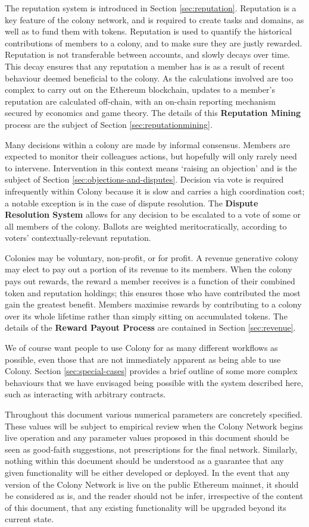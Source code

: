 The reputation system is introduced in Section \ref{sec:reputation}. Reputation is a key feature of the colony network, and is required to create tasks and domains, as well as to fund them with tokens. Reputation is used to quantify the historical contributions of members to a colony, and to make sure they are justly rewarded. Reputation is not transferable between accounts, and slowly decays over time. This decay ensures that any reputation a member has is as a result of recent behaviour deemed beneficial to the colony. As the calculations involved are too complex to carry out on the Ethereum blockchain, updates to a member's reputation are calculated off-chain, with an on-chain reporting mechanism secured by economics and game theory. The details of this \textbf{Reputation Mining} process are the subject of Section \ref{sec:reputationmining}.

Many decisions within a colony are made by informal consensus. Members are expected to monitor their colleagues actions, but hopefully will only rarely need to intervene. Intervention in this context means `raising an objection' and is the subject of Section \ref{sec:objections-and-disputes}. Decision via vote is required infrequently within Colony because it is slow and carries a high coordination cost; a notable exception is in the case of dispute resolution. The \textbf{Dispute Resolution System} allows for any decision to be escalated to a vote of some or all members of the colony. Ballots are weighted meritocratically, according to voters' contextually-relevant reputation.

Colonies may be voluntary, non-profit, or for profit. A revenue generative colony may elect to pay out a portion of its revenue to its members. When the colony pays out rewards, the reward a member receives is a function of their combined token and reputation holdings; this ensures those who have contributed the most gain the greatest benefit. Members maximise rewards by contributing to a colony over its whole lifetime rather than simply sitting on accumulated tokens. The details of the \textbf{Reward Payout Process} are contained in Section \ref{sec:revenue}.

We of course want people to use Colony for as many different workflows as possible, even those that are not immediately apparent as being able to use Colony. Section \ref{sec:special-cases} provides a brief outline of some more complex behaviours that we have envisaged being possible with the system described here, such as interacting with arbitrary contracts.

Throughout this document various numerical parameters are concretely specified. These values will be subject to empirical review when the Colony Network begins live operation and any parameter values proposed in this document should be seen as good-faith suggestions, not prescriptions for the final network. Similarly, nothing within this document should be understood as a guarantee that any given functionality will be either developed or deployed. In the event that any version of the Colony Network is live on the public Ethereum mainnet, it should be considered as is, and the reader should not be infer, irrespective of the content of this document, that any existing functionality will be upgraded beyond its current state.

